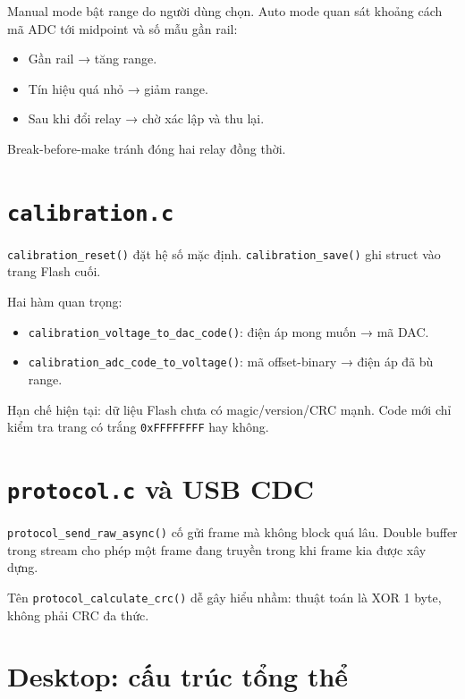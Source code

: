 \documentclass[12pt,a4paper,oneside]{article}
\newcommand{\inlinecode}[1]{\texttt{#1}}
\begin{document}
Manual mode bật range do người dùng chọn. Auto mode quan sát khoảng cách mã ADC tới midpoint và số mẫu gần rail:

\begin{itemize}
\item Gần rail → tăng range.
\item Tín hiệu quá nhỏ → giảm range.
\item Sau khi đổi relay → chờ xác lập và thu lại.
\end{itemize}

Break-before-make tránh đóng hai relay đồng thời.

\section{\inlinecode{calibration.c}}

\inlinecode{calibration\_reset()} đặt hệ số mặc định. \inlinecode{calibration\_save()} ghi struct vào trang Flash cuối.

Hai hàm quan trọng:

\begin{itemize}
\item \inlinecode{calibration\_voltage\_to\_dac\_code()}: điện áp mong muốn → mã DAC.
\item \inlinecode{calibration\_adc\_code\_to\_voltage()}: mã offset-binary → điện áp đã bù range.
\end{itemize}

Hạn chế hiện tại: dữ liệu Flash chưa có magic/version/CRC mạnh. Code mới chỉ kiểm tra trang có trắng \inlinecode{0xFFFFFFFF} hay không.

\section{\inlinecode{protocol.c} và USB CDC}

\inlinecode{protocol\_send\_raw\_async()} cố gửi frame mà không block quá lâu. Double buffer trong stream cho phép một frame đang truyền trong khi frame kia được xây dựng.

Tên \inlinecode{protocol\_calculate\_crc()} dễ gây hiểu nhầm: thuật toán là XOR 1 byte, không phải CRC đa thức.

\section{Desktop: cấu trúc tổng thể}
\end{document}
